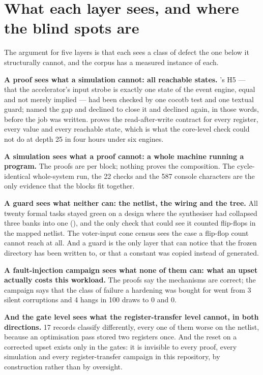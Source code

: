 \section{What each layer sees, and where the blind spots are}
\label{sec:verif-layers}

The argument for five layers is that each sees a class of defect the one
below it structurally cannot, and the corpus has a measured instance of
each.

\textbf{A proof sees what a simulation cannot: all reachable states.}
's H5 --- that the accelerator's input strobe is
exactly one state of the event engine, equal and not merely implied ---
had been checked by one cocotb test and one textual guard;
 named the gap and declined to close it and
 declined again, in those words, before the job
was written.  proves the read-after-write
contract for every register, every value and every reachable state, which
is what the core-level check could not do at depth 25 in four hours under
six engines.

\textbf{A simulation sees what a proof cannot: a whole machine running a
program.} The proofs are per block; nothing proves the composition. The
cycle-identical whole-system run, the 22 checks and the 587 console
characters are the only evidence that the blocks fit together.

\textbf{A guard sees what neither can: the netlist, the wiring and the
tree.} All twenty formal tasks stayed green on a design where the
synthesiser had collapsed three banks into one (),
and the only check that could see it counted flip-flops in the mapped
netlist. The voter-input cone census sees the case a flip-flop count
cannot reach at all. And a guard is the only layer that can notice that
the frozen directory has been written to, or that a constant was copied
instead of generated.

\textbf{A fault-injection campaign sees what none of them can: what an
upset actually costs this workload.} The proofs say the mechanisms are
correct; the campaign says that the class of failure a hardening was
bought for went from 3 silent corruptions and 4 hangs in 100 draws to 0
and 0.

\textbf{And the gate level sees what the register-transfer level cannot,
in both directions.} 17 records classify differently, every one of them
worse on the netlist, because an optimisation pass stored two registers
once. And the reset on a corrected upset exists only in the gates: it is
invisible to every proof, every simulation and every register-transfer
campaign in this repository, by construction rather than by oversight.

